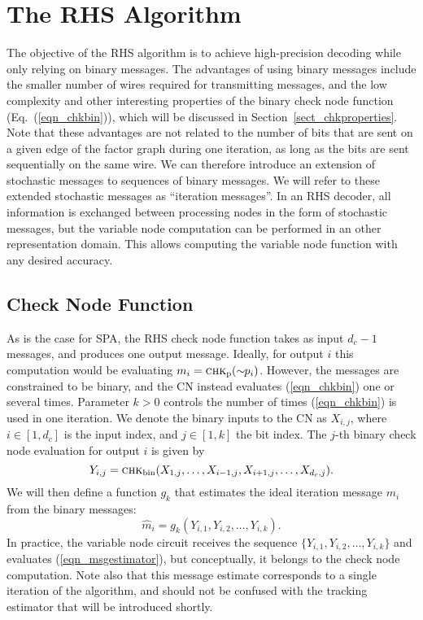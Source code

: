 \documentclass[12pt,journal,twoside,draftcls,onecolumn]{IEEEtran}
\newcommand{\cnfct}{\textsc{chk}_{\mathrm{bin}}}
\begin{document}
\section{The RHS Algorithm}
\label{sect_algorithm}

The objective of the RHS algorithm is to achieve high-precision decoding while only relying on binary messages. The advantages of using binary messages include the smaller number of wires required for transmitting messages, and the low complexity and other interesting properties of the binary check node function (Eq.~(\ref{eqn_chkbin})), which will be discussed in Section~\ref{sect_chkproperties}.
Note that these advantages are not related to the number of bits that are sent on a given edge of the factor graph during one iteration, as long as the bits are sent sequentially on the same wire.
We can therefore introduce an extension of stochastic messages to sequences of binary messages. We will refer to these extended stochastic messages as ``iteration messages''.
In an RHS decoder, all information is exchanged between processing nodes in the form of stochastic messages, but the variable node computation can be performed in an other representation domain. This allows computing the variable node function with any desired accuracy. 


\subsection{Check Node Function}
\label{sect_CNComputation}

As is the case for SPA, the RHS check node function takes as input $d_c - 1$ messages, and produces one output message. 
Ideally, for output $i$ this computation would be evaluating $m_i = \textsc{chk}_\mathrm{p}(\sim \!\! p_i)$.
However, the messages are constrained to be binary, and the CN instead evaluates (\ref{eqn_chkbin}) one or several times. Parameter $k>0$ controls the number of times (\ref{eqn_chkbin}) is used in one iteration.
We denote the binary inputs to the CN as $X_{i,j}$, where $i \in [1, d_c]$ is the input index, and $j \in [1, k]$ the bit index. 
The $j$-th binary check node evaluation for output $i$ is given by
\begin{equation}
\label{eqn_rhscn}
 Y_{i,j} = \cnfct(X_{1,j}, \ldots, X_{i-1,j}, X_{i+1,j}, \ldots, X_{d_c,j}).
\end{equation}
We will then define a function $g_k$ that estimates the ideal iteration message $m_i$ from the binary messages:
\begin{equation}
\label{eqn_msgestimator}
 \hat{m}_i = g_{k}(Y_{i,1}, Y_{i,2}, \ldots , Y_{i,k}).
\end{equation}
In practice, the variable node circuit receives the sequence $\{Y_{i,1}, Y_{i,2}, \ldots , Y_{i,k}\}$ and evaluates (\ref{eqn_msgestimator}), but conceptually, it belongs to the check node computation.
Note also that this message estimate corresponds to a single iteration of the algorithm, and should not be confused with the tracking estimator that will be introduced shortly.
\end{document}
